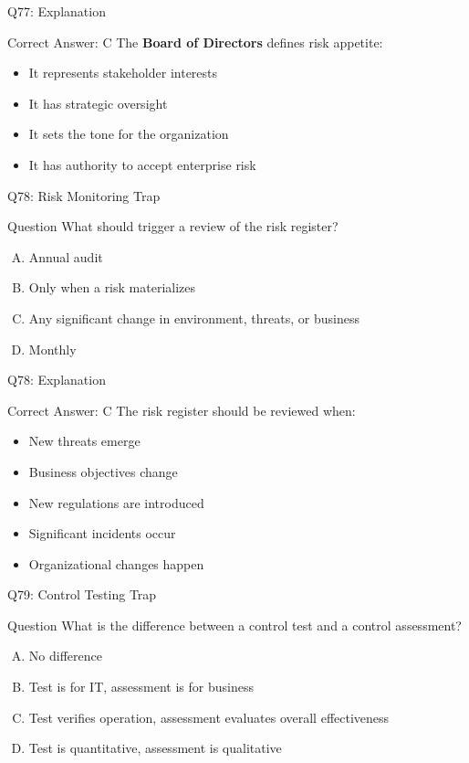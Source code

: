 \documentclass{beamer}
\begin{document}
	\begin{frame}{Q77: Explanation}
		\begin{block}{Correct Answer: C}
			The \textbf{Board of Directors} defines risk appetite:
			\begin{itemize}
				\item It represents stakeholder interests
				\item It has strategic oversight
				\item It sets the tone for the organization
				\item It has authority to accept enterprise risk
			\end{itemize}
		\end{block}
	\end{frame}
	
	\begin{frame}{Q78: Risk Monitoring Trap}
		\begin{block}{Question}
			What should trigger a review of the risk register?
		\end{block}
		\begin{enumerate}[(A)]
			\item Annual audit
			\item Only when a risk materializes
			\item Any significant change in environment, threats, or business
			\item Monthly
		\end{enumerate}
	\end{frame}
	
	\begin{frame}{Q78: Explanation}
		\begin{block}{Correct Answer: C}
			The risk register should be reviewed when:
			\begin{itemize}
				\item New threats emerge
				\item Business objectives change
				\item New regulations are introduced
				\item Significant incidents occur
				\item Organizational changes happen
			\end{itemize}
		\end{block}
	\end{frame}
	
	\begin{frame}{Q79: Control Testing Trap}
		\begin{block}{Question}
			What is the difference between a control test and a control assessment?
		\end{block}
		\begin{enumerate}[(A)]
			\item No difference
			\item Test is for IT, assessment is for business
			\item Test verifies operation, assessment evaluates overall effectiveness
			\item Test is quantitative, assessment is qualitative
		\end{enumerate}
	\end{frame}
	
\end{document}

